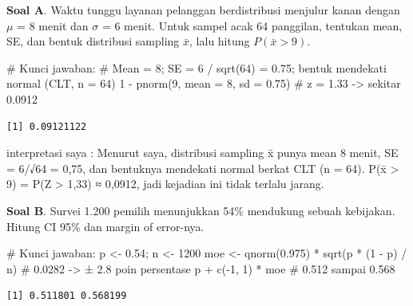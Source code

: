 \documentclass[
  indonesian,
  letterpaper,
]{book}
\newenvironment{Shaded}{\begin{snugshade}}{\end{snugshade}}
\newcommand{\AttributeTok}[1]{\textcolor[rgb]{0.40,0.45,0.13}{#1}}
\newcommand{\CommentTok}[1]{\textcolor[rgb]{0.37,0.37,0.37}{#1}}
\newcommand{\DecValTok}[1]{\textcolor[rgb]{0.68,0.00,0.00}{#1}}
\newcommand{\FloatTok}[1]{\textcolor[rgb]{0.68,0.00,0.00}{#1}}
\newcommand{\FunctionTok}[1]{\textcolor[rgb]{0.28,0.35,0.67}{#1}}
\newcommand{\NormalTok}[1]{\textcolor[rgb]{0.00,0.23,0.31}{#1}}
\newcommand{\OtherTok}[1]{\textcolor[rgb]{0.00,0.23,0.31}{#1}}
\newcommand{\SpecialCharTok}[1]{\textcolor[rgb]{0.37,0.37,0.37}{#1}}
\begin{document}
\textbf{Soal A}. Waktu tunggu layanan pelanggan berdistribusi menjulur
kanan dengan \(\mu\) = 8 menit dan \(\sigma\) = 6 menit. Untuk sampel
acak 64 panggilan, tentukan mean, SE, dan bentuk distribusi sampling
\(\bar{x}\), lalu hitung \(P(\bar{x} > 9)\).

\begin{Shaded}
\begin{Highlighting}[]
\CommentTok{\# Kunci jawaban:}
\CommentTok{\# Mean = 8; SE = 6 / sqrt(64) = 0.75; bentuk mendekati normal (CLT, n = 64)}
\DecValTok{1} \SpecialCharTok{{-}} \FunctionTok{pnorm}\NormalTok{(}\DecValTok{9}\NormalTok{, }\AttributeTok{mean =} \DecValTok{8}\NormalTok{, }\AttributeTok{sd =} \FloatTok{0.75}\NormalTok{)   }\CommentTok{\# z = 1.33 {-}\textgreater{} sekitar 0.0912}
\end{Highlighting}
\end{Shaded}

\begin{verbatim}
[1] 0.09121122
\end{verbatim}

interpretasi saya : Menurut saya, distribusi sampling x̄ punya mean 8
menit, SE = 6/√64 = 0,75, dan bentuknya mendekati normal berkat CLT (n =
64). P(x̄ \textgreater{} 9) = P(Z \textgreater{} 1,33) ≈ 0,0912, jadi
kejadian ini tidak terlalu jarang.

\textbf{Soal B}. Survei 1.200 pemilih menunjukkan 54\% mendukung sebuah
kebijakan. Hitung CI 95\% dan margin of error-nya.

\begin{Shaded}
\begin{Highlighting}[]
\CommentTok{\# Kunci jawaban:}
\NormalTok{p }\OtherTok{\textless{}{-}} \FloatTok{0.54}\NormalTok{; n }\OtherTok{\textless{}{-}} \DecValTok{1200}
\NormalTok{moe }\OtherTok{\textless{}{-}} \FunctionTok{qnorm}\NormalTok{(}\FloatTok{0.975}\NormalTok{) }\SpecialCharTok{*} \FunctionTok{sqrt}\NormalTok{(p }\SpecialCharTok{*}\NormalTok{ (}\DecValTok{1} \SpecialCharTok{{-}}\NormalTok{ p) }\SpecialCharTok{/}\NormalTok{ n)   }\CommentTok{\# 0.0282 {-}\textgreater{} ± 2.8 poin persentase}
\NormalTok{p }\SpecialCharTok{+} \FunctionTok{c}\NormalTok{(}\SpecialCharTok{{-}}\DecValTok{1}\NormalTok{, }\DecValTok{1}\NormalTok{) }\SpecialCharTok{*}\NormalTok{ moe                            }\CommentTok{\# 0.512 sampai 0.568}
\end{Highlighting}
\end{Shaded}

\begin{verbatim}
[1] 0.511801 0.568199
\end{verbatim}
\end{document}
